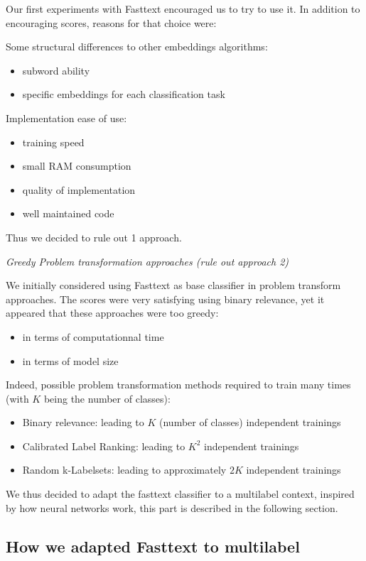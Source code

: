 Our first experiments with Fasttext encouraged us to try to use it. In addition to encouraging scores, reasons for that choice were:

Some structural differences to other embeddings algorithms:
\begin{itemize}
	\item subword ability
	\item specific embeddings for each classification task
\end{itemize}

Implementation ease of use:
\begin{itemize}
	\item training speed
	\item small RAM consumption
	\item quality of implementation
	\item well maintained code
\end{itemize}
Thus we decided to rule out 1 approach.

\textit{Greedy Problem transformation approaches (rule out approach 2)}

We initially considered using Fasttext as base classifier in problem transform approaches. The scores were very satisfying using binary relevance, yet it appeared that these approaches were too greedy:
\begin{itemize}
	\item in terms of computationnal time
	\item in terms of model size
\end{itemize}

Indeed, possible problem transformation methods required to train many times (with $K$ being the number of classes):
\begin{itemize}
	\item Binary relevance: leading to $K$ (number of classes) independent trainings
	\item Calibrated Label Ranking: leading to $K^2$ independent trainings
	\item Random k-Labelsets: leading to approximately $2K$ independent trainings
\end{itemize}

We thus decided to adapt the fasttext classifier to a multilabel context, inspired by how neural networks work, this part is described in the following section.

\subsection{How we adapted Fasttext to multilabel}

